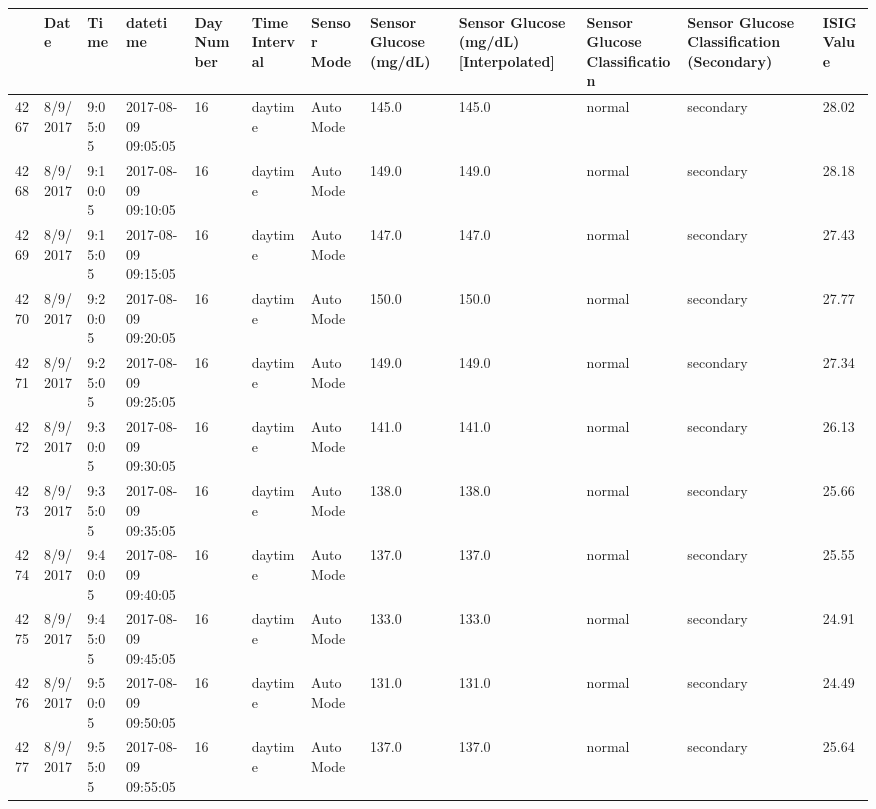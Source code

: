 \bigskip\noindent
\begin{tabular}{p{}p{}p{}p{}p{}p{}p{}p{}p{}p{}p{}p{}}
\toprule
 & Date & Time & datetime & Day Number & Time Interval & Sensor Mode & Sensor Glucose (mg/dL) & Sensor Glucose (mg/dL) [Interpolated] & Sensor Glucose Classification & Sensor Glucose Classification (Secondary) & ISIG Value \\
\hline
4267 & 8/9/2017 & 9:05:05 & 2017-08-09 09:05:05 & 16 & daytime & Auto Mode & 145.0 & 145.0 & normal & secondary & 28.02 \\
\hline
4268 & 8/9/2017 & 9:10:05 & 2017-08-09 09:10:05 & 16 & daytime & Auto Mode & 149.0 & 149.0 & normal & secondary & 28.18 \\
\hline
4269 & 8/9/2017 & 9:15:05 & 2017-08-09 09:15:05 & 16 & daytime & Auto Mode & 147.0 & 147.0 & normal & secondary & 27.43 \\
\hline
4270 & 8/9/2017 & 9:20:05 & 2017-08-09 09:20:05 & 16 & daytime & Auto Mode & 150.0 & 150.0 & normal & secondary & 27.77 \\
\hline
4271 & 8/9/2017 & 9:25:05 & 2017-08-09 09:25:05 & 16 & daytime & Auto Mode & 149.0 & 149.0 & normal & secondary & 27.34 \\
\hline
4272 & 8/9/2017 & 9:30:05 & 2017-08-09 09:30:05 & 16 & daytime & Auto Mode & 141.0 & 141.0 & normal & secondary & 26.13 \\
\hline
4273 & 8/9/2017 & 9:35:05 & 2017-08-09 09:35:05 & 16 & daytime & Auto Mode & 138.0 & 138.0 & normal & secondary & 25.66 \\
\hline
4274 & 8/9/2017 & 9:40:05 & 2017-08-09 09:40:05 & 16 & daytime & Auto Mode & 137.0 & 137.0 & normal & secondary & 25.55 \\
\hline
4275 & 8/9/2017 & 9:45:05 & 2017-08-09 09:45:05 & 16 & daytime & Auto Mode & 133.0 & 133.0 & normal & secondary & 24.91 \\
\hline
4276 & 8/9/2017 & 9:50:05 & 2017-08-09 09:50:05 & 16 & daytime & Auto Mode & 131.0 & 131.0 & normal & secondary & 24.49 \\
\hline
4277 & 8/9/2017 & 9:55:05 & 2017-08-09 09:55:05 & 16 & daytime & Auto Mode & 137.0 & 137.0 & normal & secondary & 25.64 \\

\end{tabular}
